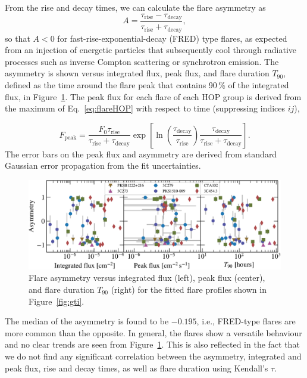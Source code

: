 \documentclass[twocolumn,linenumbers]{aastex62}
\begin{document}
From the rise and decay times, we can calculate the flare asymmetry as
\begin{equation}
    A = \frac{\tau_\mathrm{rise}-\tau_\mathrm{decay}}
    {\tau_\mathrm{rise}+\tau_\mathrm{decay}},
\end{equation}
so that $A < 0$ for fast-rise-exponential-decay (FRED) type flares, as expected from an injection of energetic particles that subsequently cool through radiative processes such as inverse Compton scattering or synchrotron emission.
The asymmetry is shown versus integrated flux, peak flux, and flare duration $T_{90}$, defined as the time around the flare peak that contains 90\,\% of the integrated flux, in Figure~\ref{fig:asym}.
The peak flux for each flare of each HOP group is derived from the maximum of  Eq.~\ref{eq:flareHOP} with respect to time (suppressing indices $ij$),

\begin{equation}
    F_{\mathrm{peak}} = \frac{F_{0} \tau_\mathrm{rise}}{\tau_\mathrm{rise} + \tau_\mathrm{decay}}\exp\left[\ln\left(\frac{\tau_\mathrm{decay}}{\tau_\mathrm{rise}}\right)\frac{\tau_\mathrm{decay}}{\tau_\mathrm{rise} + \tau_\mathrm{decay}}\right].
\end{equation}
The error bars on the peak flux and asymmetry are derived from standard Gaussian error propagation from the fit uncertainties.

\begin{figure}
    \centering
    \includegraphics[width = .8\linewidth]{lcfithop_results_asym_vs_all_orbit_maxiter2_fsys0p00_addcomp0.pdf}
    \caption{Flare asymmetry versus integrated flux (left), peak flux (center), and flare duration $T_{90}$ (right) for the fitted flare profiles shown in Figure~\ref{fig:gti}.}
    \label{fig:asym}
\end{figure}

The median of the asymmetry is found to be $-0.195$, i.e., FRED-type flares are more common than the opposite. In general, the flares show a versatile behaviour and no clear trends are seen from Figure~\ref{fig:asym}. This is also reflected in the fact that we do not find any significant correlation between the asymmetry, integrated and peak flux, rise and decay times, as well as flare duration using Kendall's $\tau$.
\end{document}

